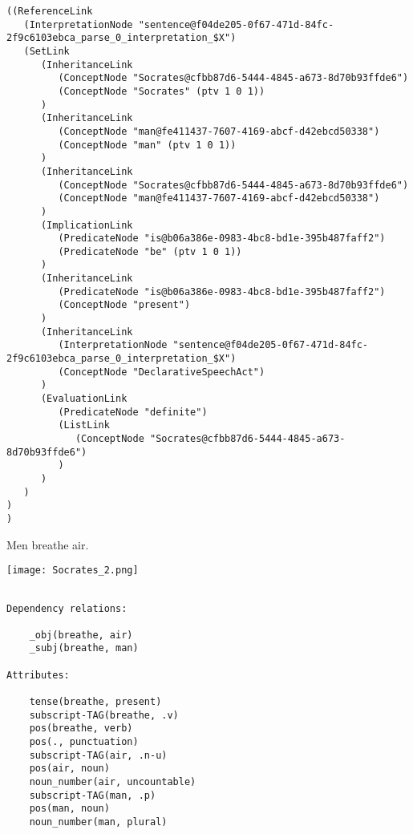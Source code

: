 \begin{verbatim}
((ReferenceLink
   (InterpretationNode "sentence@f04de205-0f67-471d-84fc-2f9c6103ebca_parse_0_interpretation_$X")
   (SetLink
      (InheritanceLink
         (ConceptNode "Socrates@cfbb87d6-5444-4845-a673-8d70b93ffde6")
         (ConceptNode "Socrates" (ptv 1 0 1))
      )
      (InheritanceLink
         (ConceptNode "man@fe411437-7607-4169-abcf-d42ebcd50338")
         (ConceptNode "man" (ptv 1 0 1))
      )
      (InheritanceLink
         (ConceptNode "Socrates@cfbb87d6-5444-4845-a673-8d70b93ffde6")
         (ConceptNode "man@fe411437-7607-4169-abcf-d42ebcd50338")
      )
      (ImplicationLink
         (PredicateNode "is@b06a386e-0983-4bc8-bd1e-395b487faff2")
         (PredicateNode "be" (ptv 1 0 1))
      )
      (InheritanceLink
         (PredicateNode "is@b06a386e-0983-4bc8-bd1e-395b487faff2")
         (ConceptNode "present")
      )
      (InheritanceLink
         (InterpretationNode "sentence@f04de205-0f67-471d-84fc-2f9c6103ebca_parse_0_interpretation_$X")
         (ConceptNode "DeclarativeSpeechAct")
      )
      (EvaluationLink
         (PredicateNode "definite")
         (ListLink
            (ConceptNode "Socrates@cfbb87d6-5444-4845-a673-8d70b93ffde6")
         )
      )
   )
)
)
\end{verbatim}

 Men breathe air.

\texttt{[image: Socrates\_2.png]}

\begin{verbatim}

Dependency relations:

    _obj(breathe, air)
    _subj(breathe, man)

Attributes:

    tense(breathe, present)
    subscript-TAG(breathe, .v)
    pos(breathe, verb)
    pos(., punctuation)
    subscript-TAG(air, .n-u)
    pos(air, noun)
    noun_number(air, uncountable)
    subscript-TAG(man, .p)
    pos(man, noun)
    noun_number(man, plural)

\end{verbatim}


